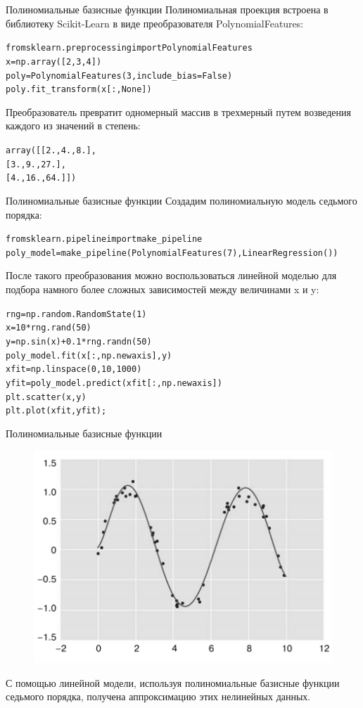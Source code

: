 \documentclass{beamer}
\begin{document}
\begin{frame}[fragile]{Полиномиальные базисные функции}
Полиномиальная проекция встроена в библиотеку Scikit-Learn в виде преобразователя PolynomialFeatures:
\begin{alltt}
from sklearn.preprocessing import PolynomialFeatures
x = np.array([2, 3, 4])
poly = PolynomialFeatures(3, include_bias=False)
poly.fit_transform(x[:, None])
\end{alltt}
Преобразователь превратит одномерный массив в трехмерный путем возведения каждого из значений в степень:
\begin{alltt}
array([[ 2., 4., 8.],
[ 3., 9., 27.],
[ 4., 16., 64.]])
\end{alltt}
\end{frame}

\begin{frame}[fragile]{Полиномиальные базисные функции}
Создадим полиномиальную модель седьмого порядка:
\begin{alltt}
from sklearn.pipeline import make_pipeline
poly_model = make_pipeline(PolynomialFeatures(7), LinearRegression())
\end{alltt}
После такого преобразования можно воспользоваться линейной моделью для подбора намного более сложных зависимостей между величинами x и y:
\begin{alltt}
rng = np.random.RandomState(1)
x = 10 * rng.rand(50)
y = np.sin(x) + 0.1 * rng.randn(50)
poly_model.fit(x[:, np.newaxis], y)
xfit = np.linspace(0, 10, 1000)
yfit = poly_model.predict(xfit[:, np.newaxis])
plt.scatter(x, y)
plt.plot(xfit, yfit);
\end{alltt}
\end{frame}

\begin{frame}[fragile]{Полиномиальные базисные функции}
\begin{figure}[h]
\centering
\includegraphics[scale=0.7]{images/polynom-01.png}
\end{figure}
С помощью линейной модели, используя полиномиальные базисные функции седьмого порядка, получена аппроксимацию этих нелинейных данных.
\end{frame}
\end{document}
